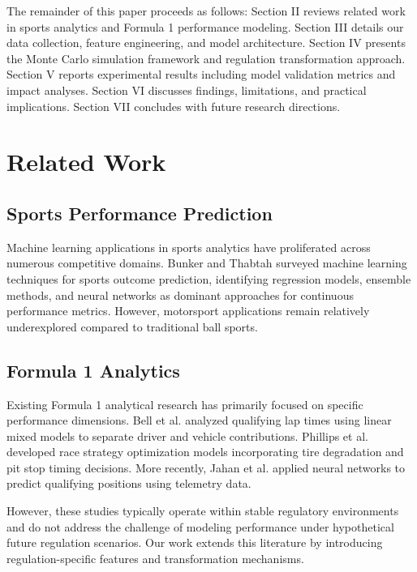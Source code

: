 \documentclass[conference]{IEEEtran}
\begin{document}
The remainder of this paper proceeds as follows: Section II reviews related work in sports analytics and Formula 1 performance modeling. Section III details our data collection, feature engineering, and model architecture. Section IV presents the Monte Carlo simulation framework and regulation transformation approach. Section V reports experimental results including model validation metrics and impact analyses. Section VI discusses findings, limitations, and practical implications. Section VII concludes with future research directions.

\section{Related Work}

\subsection{Sports Performance Prediction}

Machine learning applications in sports analytics have proliferated across numerous competitive domains. Bunker and Thabtah \cite{bunker2019} surveyed machine learning techniques for sports outcome prediction, identifying regression models, ensemble methods, and neural networks as dominant approaches for continuous performance metrics. However, motorsport applications remain relatively underexplored compared to traditional ball sports.

\subsection{Formula 1 Analytics}

Existing Formula 1 analytical research has primarily focused on specific performance dimensions. Bell et al. \cite{bell2016} analyzed qualifying lap times using linear mixed models to separate driver and vehicle contributions. Phillips et al. \cite{phillips2014} developed race strategy optimization models incorporating tire degradation and pit stop timing decisions. More recently, Jahan et al. \cite{jahan2023} applied neural networks to predict qualifying positions using telemetry data.

However, these studies typically operate within stable regulatory environments and do not address the challenge of modeling performance under hypothetical future regulation scenarios. Our work extends this literature by introducing regulation-specific features and transformation mechanisms.
\end{document}
